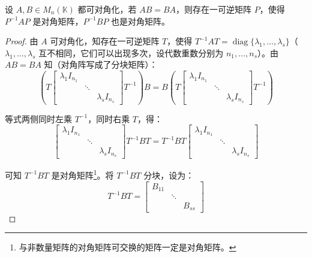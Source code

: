 \begin{theorem}
	设 $A, B \in M_n(\mathbb K)$ 都可对角化，若 $AB = BA$，则存在一可逆矩阵 $P$，使得 $P^{-1} A P$ 是对角矩阵，$P^{-1} B P$ 也是对角矩阵。
\end{theorem}

\begin{proof}
	由 $A$ 可对角化，知存在一可逆矩阵 $T$，使得 $T^{-1} AT = \operatorname{diag}\{\lambda_1, \ldots, \lambda_s\}$（$\lambda_1, \ldots, \lambda_s$ 互不相同，它们可以出现多次，设代数重数分别为 $n_1, \ldots, n_s$）。由 $AB = BA$ 知（对角阵写成了分块矩阵）：
	$$
	\left(
	T
	\begin{bmatrix}
		\lambda_1 I_{n_1} & &
		\\
		& \ddots &
		\\
		& & \lambda_s I_{n_s}
	\end{bmatrix}
	T^{-1}
	\right)
	B = B
	\left(
	T
	\begin{bmatrix}
		\lambda_1 I_{n_1} & &
		\\
		& \ddots &
		\\
		& & \lambda_s I_{n_s}
	\end{bmatrix}
	T^{-1}
	\right)
	$$

	等式两侧同时左乘 $T^{-1}$，同时右乘 $T$，得：
	$$
	\begin{bmatrix}
		\lambda_1 I_{n_1} & &
		\\
		& \ddots &
		\\
		& & \lambda_s I_{n_s}
	\end{bmatrix}
	T^{-1}BT = T^{-1}BT
	\begin{bmatrix}
		\lambda_1 I_{n_1} & &
		\\
		& \ddots &
		\\
		& & \lambda_s I_{n_s}
	\end{bmatrix}
	$$

	可知 $T^{-1}BT$ 是对角矩阵\footnote{与非数量矩阵的对角矩阵可交换的矩阵一定是对角矩阵。}。将 $T^{-1}BT$ 分块，设为：
	$$
	T^{-1}BT =
	\begin{bmatrix}
		B_{11} & &
		\\
		& \ddots &
		\\
		& & B_{ss}
	\end{bmatrix}
	$$


\end{proof}
